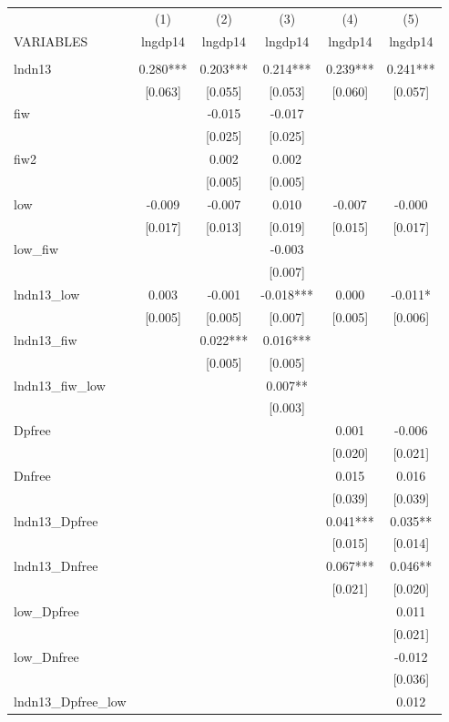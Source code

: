 \begin{tabular}{lccccc} \hline
 & (1) & (2) & (3) & (4) & (5) \\
VARIABLES & lngdp14 & lngdp14 & lngdp14 & lngdp14 & lngdp14 \\ \hline
 &  &  &  &  &  \\
lndn13 & 0.280*** & 0.203*** & 0.214*** & 0.239*** & 0.241*** \\
 & [0.063] & [0.055] & [0.053] & [0.060] & [0.057] \\
fiw &  & -0.015 & -0.017 &  &  \\
 &  & [0.025] & [0.025] &  &  \\
fiw2 &  & 0.002 & 0.002 &  &  \\
 &  & [0.005] & [0.005] &  &  \\
low & -0.009 & -0.007 & 0.010 & -0.007 & -0.000 \\
 & [0.017] & [0.013] & [0.019] & [0.015] & [0.017] \\
low\_fiw &  &  & -0.003 &  &  \\
 &  &  & [0.007] &  &  \\
lndn13\_low & 0.003 & -0.001 & -0.018*** & 0.000 & -0.011* \\
 & [0.005] & [0.005] & [0.007] & [0.005] & [0.006] \\
lndn13\_fiw &  & 0.022*** & 0.016*** &  &  \\
 &  & [0.005] & [0.005] &  &  \\
lndn13\_fiw\_low &  &  & 0.007** &  &  \\
 &  &  & [0.003] &  &  \\
Dpfree &  &  &  & 0.001 & -0.006 \\
 &  &  &  & [0.020] & [0.021] \\
Dnfree &  &  &  & 0.015 & 0.016 \\
 &  &  &  & [0.039] & [0.039] \\
lndn13\_Dpfree &  &  &  & 0.041*** & 0.035** \\
 &  &  &  & [0.015] & [0.014] \\
lndn13\_Dnfree &  &  &  & 0.067*** & 0.046** \\
 &  &  &  & [0.021] & [0.020] \\
low\_Dpfree &  &  &  &  & 0.011 \\
 &  &  &  &  & [0.021] \\
low\_Dnfree &  &  &  &  & -0.012 \\
 &  &  &  &  & [0.036] \\
lndn13\_Dpfree\_low &  &  &  &  & 0.012 \\

\end{tabular}
